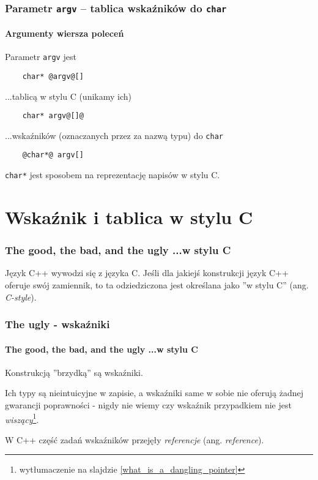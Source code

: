 \documentclass[aspectratio=169]{beamer}
\begin{document}
\begin{frame}[fragile]
    \frametitle{Parametr {\tt argv} -- tablica wskaźników do {\tt char}}
    \framesubtitle{Argumenty wiersza poleceń}

    Parametr {\tt argv} jest
    \begin{lstlisting}
    char* @argv@[]
    \end{lstlisting}
    \vspace{1em}

    ...tablicą w stylu C (unikamy ich)
    \begin{lstlisting}
    char* argv@[]@
    \end{lstlisting}
    \vspace{1em}

    ...wskaźników (oznaczanych przez {\tt *} za nazwą typu) do {\tt char}
    \begin{lstlisting}
    @char*@ argv[]
    \end{lstlisting}
    \vspace{1em}

    {\tt char*} jest sposobem na reprezentację napisów w stylu C.
\end{frame}

\section{Wskaźnik i tablica w stylu C}

\begin{frame}
    \frametitle{The good, the bad, and the ugly ...w stylu C}

    Język C++ wywodzi się z języka C. Jeśli dla jakiejś konstrukcji język C++
    oferuje swój zamiennik, to ta odziedziczona jest określana jako ''w stylu
    C'' (ang. \emph{C-style}).
\end{frame}

\begin{frame}
    \frametitle{The ugly - wskaźniki}
    \framesubtitle{The good, the bad, and the ugly ...w stylu C}

    Konstrukcją ''brzydką'' są wskaźniki.

    \vspace{1em}

    Ich typy są nieintuicyjne w zapisie, a wskaźniki same w sobie nie oferują
    żadnej gwarancji poprawności - nigdy nie wiemy czy wskaźnik przypadkiem nie
    jest \emph{wiszący}\footnote{wytłumaczenie na slajdzie
    \ref{what_is_a_dangling_pointer}}.

    \vspace{1em}

    W C++ część zadań wskaźników przejęły \emph{referencje} (ang.
    \emph{reference}).
\end{frame}
\end{document}
